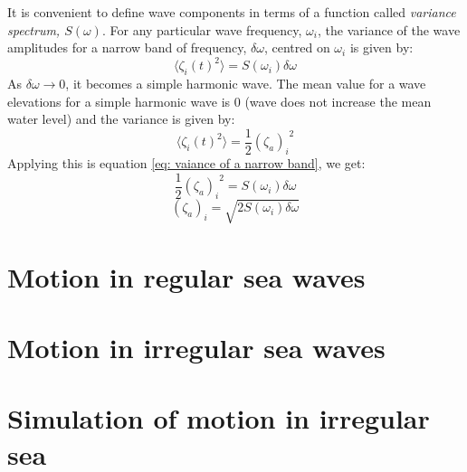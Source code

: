It is convenient to define wave components in terms of a function called 
\textit{variance spectrum, $S(\omega)$}. For any particular wave frequency,
$\omega_i$, the variance of the wave amplitudes for a narrow band of frequency,
$\delta \omega$, centred on $\omega_i$ is given by:
\begin{equation}
  \langle \zeta_i (t)^2 \rangle = S(\omega_i) \delta \omega
  \label{eq: variance of a narrow band}
\end{equation}
As $\delta \omega \to 0$, it becomes a simple harmonic wave. The mean value for
a wave elevations for a simple harmonic wave is $0$ (wave does not increase the
mean water level) and the variance is given by:
\begin{equation}
  \langle \zeta_i (t)^2 \rangle = \frac{1}{2} {(\zeta_a)_i }^2
\end{equation}
Applying this is equation \ref{eq: vaiance of a narrow band}, we get:
\begin{equation}
  \frac{1}{2} {(\zeta_a)_i}^2 = S(\omega_i) \delta \omega
\end{equation}
\begin{equation}
  (\zeta_a)_i = \sqrt{2 S(\omega_i) \delta \omega}
\end{equation}


\section{Motion in regular sea waves}

\section{Motion in irregular sea waves}

\section{Simulation of motion in irregular sea}


